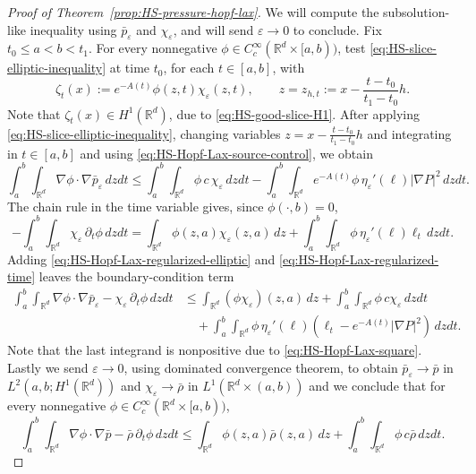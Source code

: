 \documentclass[11pt]{amsart}
\numberwithin{equation}{section}
\numberwithin{figure}{section}
\theoremstyle{plain}
\theoremstyle{definition}
\theoremstyle{remark}
\theoremstyle{plain}
\newcommand{\abs}[1]{\lvert #1 \rvert}
\newcommand{\vep}{\varepsilon}
\def\R{\mathbb{R}}
\def\e{\varepsilon}
\begin{document}
\begin{proof}[Proof of Theorem~\ref{prop:HS-pressure-hopf-lax}]
We will compute the subsolution-like inequality using $\bar p_\e$ and $\chi_\e$, and will send $\e\to 0$ to conclude. Fix \(t_0\leq a<b<t_1\).  For every nonnegative
\(\phi\in C_c^\infty(\R^d\times[a,b))\), test
\eqref{eq:HS-slice-elliptic-inequality} at time \(t_0\), for each
\(t\in[a,b]\), with
\[
    \zeta_t(x):=
    e^{-A(t)}
    \phi(z,t)
    \chi_\vep(z,t),\qquad z=z_{h,t} := x-\frac{t-t_0}{t_1-t_0}h.
\]
Note that $\zeta_t(x)\in H^1(\R^d)$, due to
\eqref{eq:HS-good-slice-H1}.  
After applying
\eqref{eq:HS-slice-elliptic-inequality}, changing variables
\(z=x-\frac{t-t_0}{t_1-t_0}h\) and integrating in \(t\in[a,b]\) and using \eqref{eq:HS-Hopf-Lax-source-control},  we obtain
\begin{equation}\label{eq:HS-Hopf-Lax-regularized-elliptic}
    \int_a^b\!\!\int_{\R^d}\nabla\phi\cdot\nabla \bar p_\vep\,dzdt
    \leq
    \int_a^b\!\!\int_{\R^d}\phi\,c\,\chi_\vep\,dzdt 
      -\int_a^b\!\!\int_{\R^d}
    e^{-A(t)}\phi\,\eta_\vep'(\ell)\abs{\nabla P}^2\,dzdt .
\end{equation}
  The chain rule in the time variable
gives, since \(\phi(\cdot,b)=0\),
\begin{equation}\label{eq:HS-Hopf-Lax-regularized-time}
    -\int_a^b\!\!\int_{\R^d}\chi_\vep\,\partial_t\phi\,dzdt
    =
    \int_{\R^d}\phi(z,a)\chi_\vep(z,a)\,dz
    +\int_a^b\!\!\int_{\R^d}
    \phi\,\eta_\vep'(\ell)\ell_t\,dzdt .
\end{equation}
Adding \eqref{eq:HS-Hopf-Lax-regularized-elliptic} and
\eqref{eq:HS-Hopf-Lax-regularized-time} leaves the boundary-condition term
\begin{equation}\label{eq:HS-Hopf-Lax-regularized-subsolution}
\begin{aligned}
    \int_a^b\!\!\int_{\R^d}
    \nabla\phi\cdot\nabla \bar p_\vep-\chi_\vep\,\partial_t\phi\,dzdt
    &\leq
    \int_{\R^d}(\phi\chi_\vep)(z,a)\,dz +\int_a^b\!\!\int_{\R^d}\phi\,c\chi_\vep\,dzdt \\
    &\quad
    +\int_a^b\!\!\int_{\R^d}
    \phi\,\eta_\vep'(\ell)
    \left(\ell_t-e^{-A(t)}\abs{\nabla P}^2\right)\,dzdt .
\end{aligned}
\end{equation}
Note that the last integrand is nonpositive due to  \eqref{eq:HS-Hopf-Lax-square}.
Lastly we send $\e\to 0$, using dominated convergence theorem, to obtain
\(\bar p_\vep\to \bar p\) in \(L^2(a,b;H^1(\R^d))\) and
\(\chi_\vep\to\bar\rho\) in \(L^1(\R^d\times(a,b))\) and we conclude that
 for every nonnegative
\(\phi\in C_c^\infty(\R^d\times[a,b))\),
\begin{equation}\label{eq:HS-Hopf-Lax-bar-p-distributional-subsolution}
    \int_a^b\!\!\int_{\R^d}
    \nabla\phi\cdot\nabla \bar p-\bar\rho\,\partial_t\phi\,dzdt
    \leq
    \int_{\R^d}\phi(z,a)\bar\rho(z,a)\,dz
    +\int_a^b\!\!\int_{\R^d}\phi\,c\bar\rho\,dzdt .
\end{equation}


\end{proof}
\end{document}
